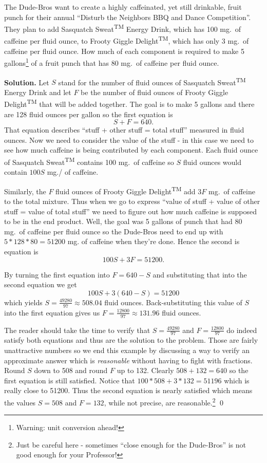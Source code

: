 \documentclass{ximera}
\begin{document}
\begin{example} \label{dudebromixture} The Dude-Bros want to create a highly caffeinated, yet still drinkable, fruit punch for their annual ``Disturb the Neighbors BBQ and Dance Competition''. They plan to add Sasquatch Sweat\textsuperscript{TM} Energy Drink, which has 100 mg.\ of caffeine per fluid ounce, to Frooty Giggle Delight\textsuperscript{TM}, which has only 3 mg.\ of caffeine per fluid ounce.  How much of each component is required to make 5 gallons\footnote{Warning: unit conversion ahead!} of a fruit punch that has 80 mg.\ of caffeine per fluid ounce.

 

{\bf Solution.}  Let $S$ stand for the number of fluid ounces of Sasquatch Sweat\textsuperscript{TM} Energy Drink and let $F$ be the number of fluid ounces of Frooty Giggle Delight\textsuperscript{TM} that will be added together.  The goal is to make 5 gallons and there are 128 fluid ounces per gallon so the first equation is \[S + F = 640.\] That equation describes ``stuff + other stuff = total stuff'' measured in fluid ounces. Now we need to consider the value of the stuff - in this case we need to see how much caffeine is being contributed by each component.  Each fluid ounce of Sasquatch Sweat\textsuperscript{TM} contains 100 mg.\ of caffeine so $S$ fluid ounces would contain $100S$ mg./ of caffeine.

 

Similarly, the $F$ fluid ounces of Frooty Giggle Delight\textsuperscript{TM} add $3F$ mg.\ of caffeine to the total mixture.  Thus when we go to express ``value of stuff + value of other stuff = value of total stuff'' we need to figure out how much caffeine is supposed to be in the end product.  Well, the goal was 5 gallons of punch that had 80 mg.\ of caffeine per fluid ounce so the Dude-Bros need to end up with $5*128*80 = 51200$ mg. of caffeine when they're done.  Hence the second is equation is \[100S + 3F = 51200.\]

 

By turning the first equation into $F = 640 - S$ and substituting that into the second equation we get \[100S + 3(640 - S) = 51200\] which yields $S = \frac{49280}{97} \approx 508.04$ fluid ounces.  Back-substituting this value of $S$ into the first equation gives us $F = \frac{12800}{97} \approx 131.96$ fluid ounces.

  

The reader should take the time to verify that $S = \frac{49280}{97}$ and $F = \frac{12800}{97}$ do indeed satisfy both equations and thus are the solution to the problem. Those are fairly unattractive numbers so we end this example by discussing a way to verify an approximate answer which is \emph{reasonable} without having to fight with fractions.  Round $S$ down to 508 and round $F$ up to 132. Clearly $508 + 132 = 640$ so the first equation is still satisfied.  Notice that $100*508 + 3*132 = 51196$ which is really close to 51200. Thus the second equation is nearly satisfied which means the values $S = 508$ and $F = 132$, while not precise, are reasonable.\footnote{Just be careful here - sometimes ``close enough for the Dude-Bros'' is not good enough for your Professor!} \qed

\end{example}




\closegraphsfile
\end{document}
